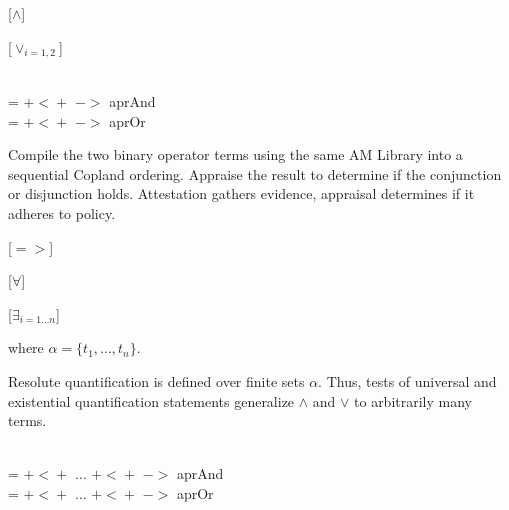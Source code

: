 \documentclass[runningheads]{llncs}
\theoremstyle{definition}
\begin{document}
[$\wedge$]

[$\vee_{i=1,2}$]

\begin{definition} \\
   =  $\mathsf{+\!<\!+}$
   $->$ aprAnd \\
   =  $\mathsf{+\!<\!+}$
   $->$ aprOr
\end{definition}

Compile the two binary operator terms using the same AM Library into a
sequential Copland ordering.  Appraise the result to determine if the
conjunction or disjunction holds.  Attestation gathers evidence,
appraisal determines if it adheres to policy.

[$=>$]

\begin{definition}[Implication]
  
\end{definition}

\begin{minipage}{0.45\linewidth}
 [$\forall$]
\end{minipage}
\begin{minipage}{0.45\linewidth}
  [$\exists_{i=1\ldots n}$]
\end{minipage}

where $\alpha=\{t_1,\ldots,t_n\}$.

Resolute quantification is defined over finite sets $\alpha$. Thus,
tests of universal and existential quantification statements
generalize $\wedge$ and $\vee$ to arbitrarily many terms.

\begin{definition}\\
   =  $\mathsf{+\!<\!+}$
  $\ldots$ $\mathsf{+\!<\!+}$ $->$ aprAnd \\
   =  $\mathsf{+\!<\!+}$
  $\ldots$ $\mathsf{+\!<\!+}$ $->$ aprOr
\end{definition}
\end{document}
